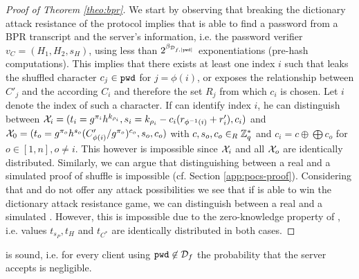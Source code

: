 \begin{proof}[Proof of Theorem \ref{theo:bpr}]
We start by observing that breaking the dictionary attack resistance of the protocol implies that \cA is able to find a password \pwd from a \ac{BPR} transcript and the server's information, i.e. the password verifier $v_C=(H_1,H_2,s_H)$, using less than $2^{\beta_{\mathcal{D}_{f,|\mathtt{pwd}|}}}$ exponentiations (pre-hash computations).
This implies that there exists at least one index $i$ such that \PoM leaks the shuffled character $c_j\in\mathtt{pwd}$ for $j=\phi(i)$, or \PoS exposes the relationship between $C'_j$ and the according $C_i$ and therefore the set $R_j$ from which $c_i$ is chosen.
Let $i$ denote the index of such a character.
If \cA can identify index $i$, he can distinguish between $\mathcal{X}_i=(t_i=g^{\pi_i}h^{k_{\rho_i}}, s_i=k_{\rho_i}-c_i(r_{\phi^{-1}(i)}+r'_i), c_i)$ and $\mathcal{X}_0=(t_o=g^{\pi_o}h^{s_o}(C'_{\phi(i)}/g^{\pi_o})^{c_o}, s_o, c_o)$ with $c,s_o,c_o\in_R\mathbb{Z}^\ast_q$ and $c_i=c\oplus \bigoplus c_o$ for $o\in[1,n], o\not=i$.
This however is impossible since $\mathcal{X}_i$ and all $\mathcal{X}_o$ are identically distributed.
Similarly, we can argue that distinguishing between a real and a simulated proof of shuffle is impossible (cf. Section \ref{app:pocs-proof}).
Considering that \PoM and \PoS do not offer any attack possibilities we see that if \cA is able to win the dictionary attack resistance game, we can distinguish between a real and a simulated \PoE.
However, this is impossible due to the zero-knowledge property of \PoE, i.e. values $t_{s_P}, t_H$ and $t_{C^\ast}$ are identically distributed in both cases.


\end{proof}

\begin{claim}
  \PoM is sound, i.e. for every client \Client using $\mathtt{pwd}\not\in\mathcal{D}_f$ the probability that the server accepts \PoM is negligible.
\end{claim}

